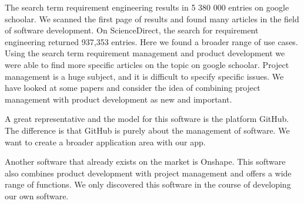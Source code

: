     The search term requirement engineering results in 5 380 000 entries on google schoolar. We scanned the first page of results and found many articles in the field of software development. On ScienceDirect, the search for requirement engineering returned 937,353 entries. Here we found a broader range of use cases. Using the search term requirement management and product development we were able to find more specific articles on the topic on google schoolar. Project management is a huge subject, and it is difficult to specify specific issues. We have looked at some papers and consider the idea of combining project management with product development as new and important.

    A great representative and the model for this software is the platform GitHub. The difference is that GitHub is purely about the management of software. We want to create a broader application area with our app. 

    Another software that already exists on the market is Onshape. This software also combines product development with project management and offers a wide range of functions. We only discovered this software in the course of developing our own software. 
